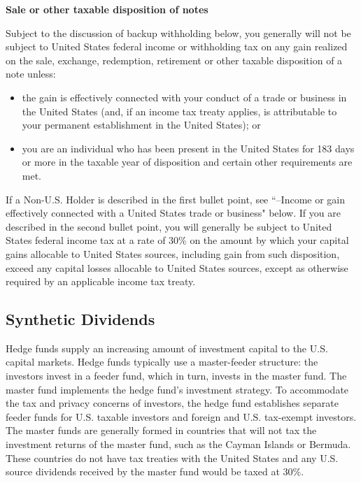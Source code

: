 \begin{select}
\begin{center}\textbf{Sale or other taxable disposition of notes}
\end{center}
Subject to the discussion of backup withholding below, you generally will not be subject to United States federal income or withholding tax on any gain realized on the sale, exchange, redemption, retirement or other taxable disposition of a note unless:
\begin{itemize}
	\item the gain is effectively connected with your conduct of a trade or business in the United States (and, if an income tax treaty applies, is attributable to your permanent establishment in the United States); or 
	\item you are an individual who has been present in the United States for 183 days or more in the taxable year of disposition and certain other requirements are met.
\end{itemize}
	
	If a Non-U.S. Holder is described in the first bullet point, see ``--Income or gain effectively connected with a United States trade or business" below. If you are described in the second bullet point, you will generally be subject to United States federal income tax at a rate of 30\% on the amount by which your capital gains allocable to United States sources, including gain from such disposition, exceed any capital losses allocable to United States sources, except as otherwise required by an applicable income tax treaty.
\end{select}



	\subsection{Synthetic Dividends}

Hedge funds supply an increasing amount of investment capital to the U.S. capital markets.  Hedge funds typically use a master-feeder structure:  the investors invest in a feeder fund, which in turn, invests in the master fund.  The master fund implements the hedge fund's investment strategy.  To accommodate the tax and privacy concerns of investors, the hedge fund establishes separate feeder funds for U.S. taxable investors and foreign and U.S. tax-exempt investors.  The master funds are generally formed in countries that will not tax the investment returns of the master fund, such as the Cayman Islands or Bermuda.  These countries do not have tax treaties with the United States and any U.S. source dividends received by the master fund would be taxed at 30\%.

